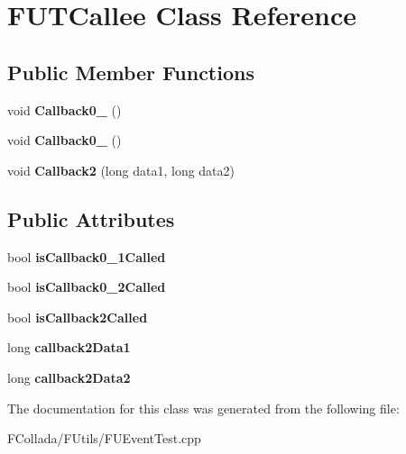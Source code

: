 \hypertarget{classFUTCallee}{
\section{FUTCallee Class Reference}
\label{classFUTCallee}
}
\subsection*{Public Member Functions}
\begin{DoxyCompactItemize}
\item 
\hypertarget{classFUTCallee_afa5098b38456f309257cb3acb818000b}{
void {\bfseries Callback0\_} ()}
\label{classFUTCallee_afa5098b38456f309257cb3acb818000b}

\item 
\hypertarget{classFUTCallee_a25de343aa5eea5d65b4d585b8916891a}{
void {\bfseries Callback0\_} ()}
\label{classFUTCallee_a25de343aa5eea5d65b4d585b8916891a}

\item 
\hypertarget{classFUTCallee_a4c8d46e3ea20dc61da593e0e56469b55}{
void {\bfseries Callback2} (long data1, long data2)}
\label{classFUTCallee_a4c8d46e3ea20dc61da593e0e56469b55}

\end{DoxyCompactItemize}
\subsection*{Public Attributes}
\begin{DoxyCompactItemize}
\item 
\hypertarget{classFUTCallee_a1cc51dfe1cb10349f9ede95d7e916118}{
bool {\bfseries isCallback0\_\-1Called}}
\label{classFUTCallee_a1cc51dfe1cb10349f9ede95d7e916118}

\item 
\hypertarget{classFUTCallee_af018ebe56fe5c0eae9aeec189a7215c4}{
bool {\bfseries isCallback0\_\-2Called}}
\label{classFUTCallee_af018ebe56fe5c0eae9aeec189a7215c4}

\item 
\hypertarget{classFUTCallee_a300716b8f9899e52c860a9e888350039}{
bool {\bfseries isCallback2Called}}
\label{classFUTCallee_a300716b8f9899e52c860a9e888350039}

\item 
\hypertarget{classFUTCallee_ab579d5adc730f2d67bae0cb661c4a244}{
long {\bfseries callback2Data1}}
\label{classFUTCallee_ab579d5adc730f2d67bae0cb661c4a244}

\item 
\hypertarget{classFUTCallee_a869181a0622fb400740e41dd02e1098b}{
long {\bfseries callback2Data2}}
\label{classFUTCallee_a869181a0622fb400740e41dd02e1098b}

\end{DoxyCompactItemize}


The documentation for this class was generated from the following file:\begin{DoxyCompactItemize}
\item 
FCollada/FUtils/FUEventTest.cpp\end{DoxyCompactItemize}
